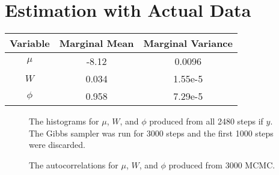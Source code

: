 \documentclass{article}
\begin{document}
\newpage
\newpage
\newpage
\newpage
\newpage
\newpage
\newpage

\section{Estimation with Actual Data}

\begin{comment}
Using data my Time Series class I calibrated our Part IV model using S\&P data from Jan. 04, 1999 to May 27, 1999.

\begin{figure}[!h]

\end{figure}
\end{comment}

\begin{center}
\begin{tabular}{c | c | c}
Variable & Marginal Mean & Marginal Variance \\
\hline
$\mu$ & -8.12 & 0.0096 \\
$W$ & 0.034 & 1.55e-5 \\
$\phi$ & 0.958 & 7.29e-5 \\
\end{tabular}
\end{center}

\begin{figure}[!h]
\begin{center}
\end{center}
\label{DLM4:histograms}
\caption{The histograms for $\mu$, $W$, and $\phi$ produced from all 2480 steps if $y$.  The Gibbs sampler was run for 3000 steps and the first 1000 steps were discarded.}
\end{figure}

\begin{figure}[!h]
\begin{center}
\end{center}
\label{DLM4:histograms}
\caption{The autocorrelations for $\mu$, $W$, and $\phi$ produced from  3000 MCMC.}
\end{figure}
\end{document}
